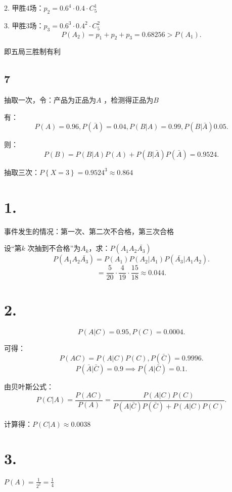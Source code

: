 2. 甲胜4场：$p_2=0.6^{4}\cdot 0.4\cdot C_{5}^{1}$ 

3. 甲胜3场：$p_3=0.6^{3}\cdot 0.4^{2}\cdot C_{5}^{2}$ 
\[
    P\left( A_2 \right) =p_1+p_2+p_3=0.68256>P\left( A_1 \right) 
.\] 

即五局三胜制有利
\subsection*{7}%
\label{sub:7}
抽取一次，令：产品为正品为$A$ ，检测得正品为$B$ 

有：\[
    P\left( A \right) =0.96,P\left( \bar{A} \right) =0.04,P\left( B|A \right) =0.99,P\left( B|\bar{A} \right) 0.05
.\]

则：\[
    P\left( B \right) =P\left( B|A \right)P\left( A \right)  +P\left( B|\bar{A} \right)P\left( \bar{A} \right) =0.9524
.\] 

抽取三次：$P\left\{ X=3 \right\} =0.9524^{3}\approx 0.864$
\section*{1. }%
\label{sec:1. }
事件发生的情况：第一次、第二次不合格，第三次合格

设“第$k$ 次抽到不合格”为$A_k$，求：$P\left( A_1A_2\bar{A_3} \right) $
\[
    P\left( A_1A_2\bar{A_3} \right) =P\left( A_1 \right) P\left( A_2|A_1 \right) P\left( \bar{A_3}|A_1A_2  \right) 
.\] 
\[
    =\frac{5}{20}\cdot \frac{4}{19}\cdot \frac{15}{18}\approx 0.044
.\] 
\section*{2. }%
\label{sec:2. }
\[
    P\left( A|C \right) =0.95,P\left( C \right) =0.0004
.\] 

可得：\[
    P\left( AC \right) =P\left( A|C \right) P\left( C \right) ,P\left( \bar{C} \right) =0.9996
.\] 
\[
    P\left( \bar{A}|\bar{C} \right) =0.9\implies P\left( A|\bar{C} \right) =0.1
.\] 

由贝叶斯公式：\[
    P\left( C|A \right) =\frac{P\left( AC \right) }{P\left( A \right) }=\frac{P\left( A|C \right) P\left( C \right) }{P\left( A|\bar{C} \right) P\left( \bar{C} \right) +P\left( A|C \right) P\left( C \right) }
.\] 

计算得：$P\left( C|A \right) \approx 0.0038$
\section*{3. }%
\label{sec:3. }
$\displaystyle{P\left( A \right) =\frac{1}{2^2}=\frac{1}{4}}$
